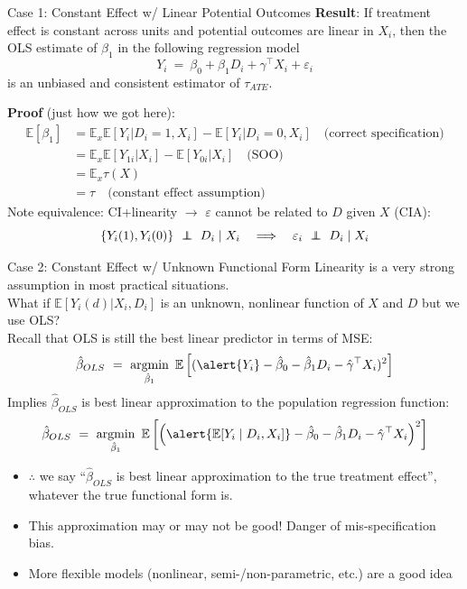 \documentclass[xcolor=dvipsnames]{beamer}
\renewcommand\r{\right}
\renewcommand\l{\left}
\renewcommand{\epsilon}{\varepsilon}
\newcommand\E{\mathbb{E}}
\DeclareMathOperator*{\argmin}{argmin}
\newcommand\indep{\protect\mathpalette{\protect\independenT}{\perp}}
\def\independenT#1#2{\mathrel{\rlap{$#1#2$}\mkern2mu{#1#2}}}
\begin{document}
\begin{frame}{Case 1: Constant Effect w/ Linear Potential Outcomes}
\textbf{Result}: 
If treatment effect is constant across units and potential outcomes are linear in $X_i$, then the OLS estimate of $\beta_1$ in the following regression model
$$ Y_i \ = \ \beta_0 + \beta_1 D_i + \gamma^\top X_i + \epsilon_i $$
is an unbiased and consistent estimator of $\tau_{ATE}$.

\bigskip
{} \textbf{Proof} (just how we got here):
\footnotesize
\begin{align*}
\E[\beta_1] &= \E_x \E[Y_i|D_i=1, X_i]-\E[Y_i|D_i=0, X_i] \quad \text{(correct specification)}\\
&= \E_x \E[Y_{1i}|X_i]- \E[Y_{0i}|X_i] \quad \text{(SOO)}\\
&= \E_x \tau(X) \\
&= \tau \quad \text{(constant effect assumption)}
\end{align*}
\medskip
{} Note equivalence:  CI+linearity $\rightarrow$ $\epsilon$ cannot be related to $D$ given $X$ (CIA):
$$ \l\{Y_i(1), Y_i(0)\r\} \ \indep \ D_i \mid X_i \quad \Longrightarrow \quad \epsilon_i \ \indep \ D_i \mid X_i $$
%
%
\end{frame}


\begin{frame}{Case 2: Constant Effect w/ Unknown Functional Form}
\small
{} Linearity is a very strong assumption in most practical situations.\\
\medskip
{} What if $\E[Y_i(d)|X_i, D_i]$ is an unknown, nonlinear function of $X$ and $D$ but we use OLS? \\
\medskip
{} Recall that OLS is still the \alert{best linear predictor} in terms of MSE:
$$\hat\beta_{OLS} \ = \ \argmin_{\hat\beta_1} \ \E\l[(\alert{Y_i} - \hat\beta_0 - \hat\beta_1 D_i - \hat\gamma^\top X_i)^2\r] $$
\medskip
{} Implies $\hat\beta_{OLS}$ is \alert{best linear approximation} to the population regression function:
$$\hat\beta_{OLS} \ = \ \argmin_{\hat\beta_1} \ \E\l[\l(\alert{\E[Y_i\mid D_i,X_i]} - \hat\beta_0 - \hat\beta_1 D_i - \hat\gamma^\top X_i\r)^2\r] $$
\footnotesize
\vspace{-.2in}
\begin{itemize}
\item<5-> $\therefore$ we say ``$\hat\beta_{OLS}$ is best linear approximation to the true treatment effect'', whatever the true functional form is.
\item<6-> This approximation may or may not be good! Danger of mis-specification bias.
\item<7-> More flexible models (nonlinear, semi-/non-parametric, etc.) are a good idea
\end{itemize}
\end{frame}
\end{document}
